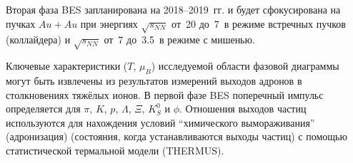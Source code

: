 
Вторая фаза BES запланирована на 2018--2019~гг. и будет сфокусирована на пучках $Au+Au$ при энергиях $\sqrt{s_{NN}}$ от~20 до~7~\GeVperNucl в режиме встречных пучков (коллайдера\todo) и $\sqrt{s_{NN}}$ от~7 до~3.5~\GeVperNucl в режиме с мишенью.





Ключевые характеристики ($T$, $\mu_{B}$) исследуемой области фазовой диаграммы могут быть извлечены из результатов измерений выходов адронов в столкновениях тяжёлых ионов. В первой фазе BES поперечный импульс определяется для $\pi$, $K$, $p$, $\Lambda$, $\Xi$, $K^{0}_{S}$ и $\phi$. Отношения выходов частиц используются для нахождения условий ``химического вымораживания'' (адронизация) (состояния, когда устанавливаются выходы частиц) с помощью статистической термальной модели (THERMUS).


